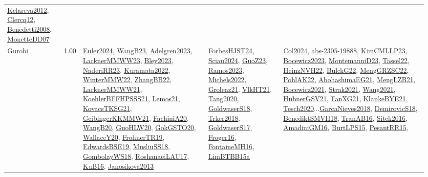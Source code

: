 {\begin{longtable}{p{3cm}r>{\raggedright\arraybackslash}p{6cm}>{\raggedright\arraybackslash}p{6cm}>{\raggedright\arraybackslash}p{8cm}}
\hyperref[detail:Kelareva2012]{Kelareva2012}, \hyperref[detail:Clercq12]{Clercq12}, \hyperref[detail:Benedetti2008]{Benedetti2008}, \hyperref[detail:MonetteDD07]{MonetteDD07}\\
\index{Gurobi}\index{CPSystems!Gurobi}Gurobi &  1.00 & \hyperref[detail:Euler2024]{Euler2024}, \hyperref[detail:WangB23]{WangB23}, \hyperref[detail:Adelgren2023]{Adelgren2023}, \hyperref[detail:LacknerMMWW23]{LacknerMMWW23}, \hyperref[detail:Bley2023]{Bley2023}, \hyperref[detail:NaderiRR23]{NaderiRR23}, \hyperref[detail:Kuramata2022]{Kuramata2022}, \hyperref[detail:WinterMMW22]{WinterMMW22}, \hyperref[detail:ZhangBB22]{ZhangBB22}, \hyperref[detail:LacknerMMWW21]{LacknerMMWW21}, \hyperref[detail:KoehlerBFFHPSSS21]{KoehlerBFFHPSSS21}, \hyperref[detail:Lemos21]{Lemos21}, \hyperref[detail:KovacsTKSG21]{KovacsTKSG21}, \hyperref[detail:GeibingerKKMMW21]{GeibingerKKMMW21}, \hyperref[detail:FachiniA20]{FachiniA20}, \hyperref[detail:WangB20]{WangB20}, \hyperref[detail:GuoHLW20]{GuoHLW20}, \hyperref[detail:GokGSTO20]{GokGSTO20}, \hyperref[detail:WallaceY20]{WallaceY20}, \hyperref[detail:FrohnerTR19]{FrohnerTR19}, \hyperref[detail:EdwardsBSE19]{EdwardsBSE19}, \hyperref[detail:MusliuSS18]{MusliuSS18}, \hyperref[detail:GombolayWS18]{GombolayWS18}, \hyperref[detail:RoshanaeiLAU17]{RoshanaeiLAU17}, \hyperref[detail:KuB16]{KuB16}, \hyperref[detail:Janosikova2013]{Janosikova2013} & \hyperref[detail:ForbesHJST24]{ForbesHJST24}, \hyperref[detail:Sciau2024]{Sciau2024}, \hyperref[detail:GuoZ23]{GuoZ23}, \hyperref[detail:Ramos2023]{Ramos2023}, \hyperref[detail:Michels2022]{Michels2022}, \hyperref[detail:Groleaz21]{Groleaz21}, \hyperref[detail:VlkHT21]{VlkHT21}, \hyperref[detail:Tang2020]{Tang2020}, \hyperref[detail:GoldwaserS18]{GoldwaserS18}, \hyperref[detail:Trker2018]{Trker2018}, \hyperref[detail:GoldwaserS17]{GoldwaserS17}, \hyperref[detail:Froger16]{Froger16}, \hyperref[detail:FontaineMH16]{FontaineMH16}, \hyperref[detail:LimBTBB15a]{LimBTBB15a} & \hyperref[detail:Col2024]{Col2024}, \hyperref[detail:abs-2305-19888]{abs-2305-19888}, \hyperref[detail:KimCMLLP23]{KimCMLLP23}, \hyperref[detail:Bocewicz2023]{Bocewicz2023}, \hyperref[detail:MontemanniD23]{MontemanniD23}, \hyperref[detail:Tassel22]{Tassel22}, \hyperref[detail:HeinzNVH22]{HeinzNVH22}, \hyperref[detail:BulckG22]{BulckG22}, \hyperref[detail:MengGRZSC22]{MengGRZSC22}, \hyperref[detail:PohlAK22]{PohlAK22}, \hyperref[detail:AbohashimaEG21]{AbohashimaEG21}, \hyperref[detail:MengLZB21]{MengLZB21}, \hyperref[detail:Bocewicz2021]{Bocewicz2021}, \hyperref[detail:Strak2021]{Strak2021}, \hyperref[detail:Wang2021]{Wang2021}, \hyperref[detail:HubnerGSV21]{HubnerGSV21}, \hyperref[detail:FanXG21]{FanXG21}, \hyperref[detail:KlankeBYE21]{KlankeBYE21}, \hyperref[detail:Tesch2020]{Tesch2020}...\hyperref[detail:GarcaNieves2018]{GarcaNieves2018}, \hyperref[detail:DemirovicS18]{DemirovicS18}, \hyperref[detail:BenediktSMVH18]{BenediktSMVH18}, \hyperref[detail:TranAB16]{TranAB16}, \hyperref[detail:Sitek2016]{Sitek2016}, \hyperref[detail:AmadiniGM16]{AmadiniGM16}, \hyperref[detail:BurtLPS15]{BurtLPS15}, \hyperref[detail:PesantRR15]{PesantRR15}, 
\end{longtable}}
